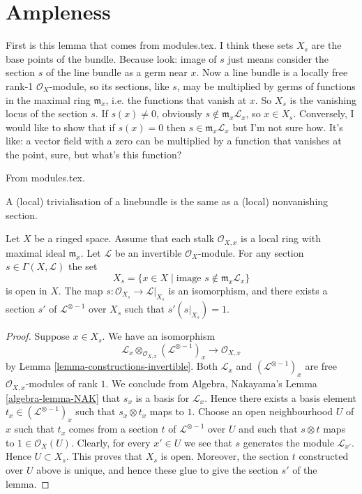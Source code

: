 \section{Ampleness}
\label{section-ampleness}

First is this lemma that comes from modules.tex. I think these sets $X_s$ are
the base points of the bundle. Because look: image of $s$ just means consider
the section $s$ of the line bundle as a germ near $x$. Now a line bundle is a
locally free rank-1 $\mathcal{O}_X$-module, so its sections, like $s$, may be
multiplied by germs of functions in the maximal ring $\mathfrak{m}_x$, i.e. the
functions that vanish at $x$. So $X_s$ is the vanishing locus of the section
$s$. If $s(x)\neq 0$, obviously $s
\not\in\mathfrak{m}_x\mathcal{L}_x$, so $x\in X_s$. Conversely, I would like to
show that if $s(x)=0$ then  $s\in\mathfrak{m}_x\mathcal{L}_x$ but I'm not sure
how. It's like: a vector field with a zero can be multiplied by a function that
vanishes at the point, sure, but what's this function?

\begin{lemma}
\label{lemma-s-open}
From modules.tex.
\begin{slogan}
A (local) trivialisation of a linebundle
is the same as a (local) nonvanishing section.
\end{slogan}
Let $X$ be a ringed space. Assume that each stalk $\mathcal{O}_{X, x}$
is a local ring with maximal ideal $\mathfrak m_x$.
Let $\mathcal{L}$ be an invertible $\mathcal{O}_X$-module.
For any section $s \in \Gamma(X, \mathcal{L})$ the set
$$
X_s = \{x \in X \mid \text{image }s \not\in \mathfrak m_x\mathcal{L}_x\}
$$
is open in $X$. The map $s : \mathcal{O}_{X_s} \to \mathcal{L}|_{X_s}$
is an isomorphism, and there exists a section $s'$
of $\mathcal{L}^{\otimes -1}$ over $X_s$ such that $s' (s|_{X_s}) = 1$.
\end{lemma}

\begin{proof}
Suppose $x \in X_s$.
We have an isomorphism
$$
\mathcal{L}_x \otimes_{\mathcal{O}_{X, x}} (\mathcal{L}^{\otimes -1})_x
\longrightarrow
\mathcal{O}_{X, x}
$$
by Lemma \ref{lemma-constructions-invertible}.
Both $\mathcal{L}_x$ and $(\mathcal{L}^{\otimes -1})_x$
are free $\mathcal{O}_{X, x}$-modules of rank $1$. We conclude
from Algebra, Nakayama's Lemma \ref{algebra-lemma-NAK} that
$s_x$ is a basis for $\mathcal{L}_x$. Hence there exists
a basis element $t_x \in (\mathcal{L}^{\otimes -1})_x$
such that $s_x \otimes t_x$ maps to $1$.
Choose an open neighbourhood $U$ of
$x$ such that $t_x$ comes from a section $t$
of $\mathcal{L}^{\otimes -1}$ over $U$ and such that
$s \otimes t$ maps to $1 \in \mathcal{O}_X(U)$.
Clearly, for every $x' \in U$ we see that $s$ generates
the module $\mathcal{L}_{x'}$. Hence $U \subset X_s$.
This proves that $X_s$ is open. Moreover, the section
$t$ constructed over $U$ above is unique, and hence
these glue to give the section $s'$ of the lemma.
\end{proof}

